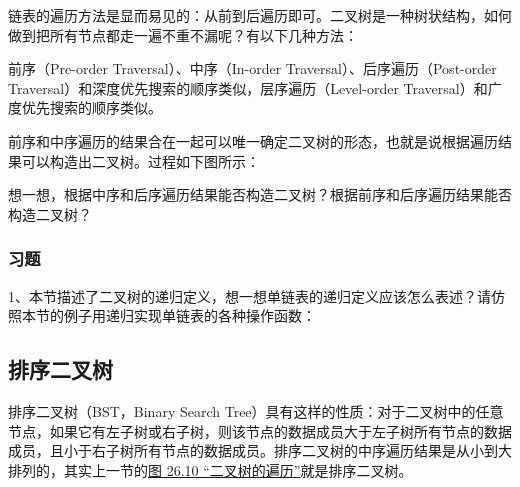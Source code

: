链表的遍历方法是显而易见的：从前到后遍历即可。二叉树是一种树状结构，如何做到把所有节点都走一遍不重不漏呢？有以下几种方法：




前序（Pre-order Traversal）、中序（In-order Traversal）、后序遍历（Post-order Traversal）和深度优先搜索的顺序类似，层序遍历（Level-order Traversal）和广度优先搜索的顺序类似。



前序和中序遍历的结果合在一起可以唯一确定二叉树的形态，也就是说根据遍历结果可以构造出二叉树。过程如下图所示：




想一想，根据中序和后序遍历结果能否构造二叉树？根据前序和后序遍历结果能否构造二叉树？






\subsubsection*{习题}
%


1、本节描述了二叉树的递归定义，想一想单链表的递归定义应该怎么表述？请仿照本节的例子用递归实现单链表的各种操作函数：



\subsection{排序二叉树}
%


排序二叉树（BST，Binary Search Tree）具有这样的性质：对于二叉树中的任意节点，如果它有左子树或右子树，则该节点的数据成员大于左子树所有节点的数据成员，且小于右子树所有节点的数据成员。排序二叉树的中序遍历结果是从小到大排列的，其实上一节的\hyperlink{db.ch26s02.id2845990}{图 26.\BookSplit{}10 “二叉树的遍历”}就是排序二叉树。


